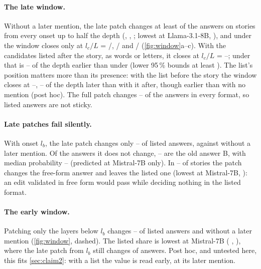 \paragraph{The late window.}
Without a later mention, the late patch changes at least \NqPoneMinMin{} of the answers on stories from every onset up to half the depth (\fmtNone, \fmtBefore, \fmtNull{}; lowest at Llama-3.1-8B, \ci{\NqPoneMinLlamaEight}{\NqPoneMinLlamaEightLo}{\NqPoneMinLlamaEightHi}), and under \fmtNone{} the window closes only at $l_c/L$ = \NqLcNoneMistralSeven/\NqLayersMistralSeven, \NqLcNoneLlamaEight/\NqLayersLlamaEight{} and \NqLcNoneQwenSeven/\NqLayersQwenSeven{} (\cref{fig:window}a--c). With the candidates listed after the story, as words or letters, it closes at $l_c/L$ = \NqLcFracListedMin--\NqLcFracListedMax; under \fmtListA{} that is \NqGapNoneAfterMin--\NqGapNoneAfterMax{} of the depth earlier than under \fmtNone{} (lower 95\,\% bounds at least \NqGapNoneAfterMistralSevenLo). The list's position matters more than its presence: with the list before the story the window closes at \NqLcFracBeforeMin--\NqLcFracBeforeMax, \NqGapBeforeAfterMin--\NqGapBeforeAfterMax{} of the depth later than with it after, though earlier than with no mention (post hoc). The full patch changes \NqFullMin--\NqFullMax{} of the answers in every format, so listed answers are not sticky.

\paragraph{Late patches fail silently.}
With onset $l_b$, the late patch changes only \NqLateListedMin--\NqLateListedMax{} of listed answers, against \NqLateFreeMin{} without a later mention. Of the \fmtListA{} answers it does not change, \pctn{\NqSilentShareAfterMin}--\pct{\NqSilentShareAfterMax} are the old answer B, with median probability \NqSilentPbAfterMin--\NqSilentPbAfterMax{} (predicted at Mistral-7B only). In \pctn{\NqInconsMin}--\pct{\NqInconsMax} of stories the patch changes the free-form answer and leaves the listed one (lowest at Mistral-7B, \ci{\NqInconsMistralSeven}{\NqInconsMistralSevenLo}{\NqInconsMistralSevenHi}): an edit validated in free form would pass while deciding nothing in the listed format.

\paragraph{The early window.}
Patching only the layers below $l_b$ changes \NqEarlyListedMin--\NqEarlyListedMax{} of listed answers and \NqEarlyFreeMax{} without a later mention (\cref{fig:window}, dashed). The listed share is lowest at Mistral-7B (\fmtListA{} \ci{\NqEarlyAfterMistralSeven}{\NqEarlyAfterMistralSevenLo}{\NqEarlyAfterMistralSevenHi}, \fmtLetter{} \ci{\NqEarlyLetterMistralSeven}{\NqEarlyLetterMistralSevenLo}{\NqEarlyLetterMistralSevenHi}), where the late patch from $l_b$ still changes \NqLateAfterMistralSeven{} of \fmtListA{} answers. Post hoc, and untested here, this fits \cref{sec:claim2}: with a list the value is read early, at its later mention.

